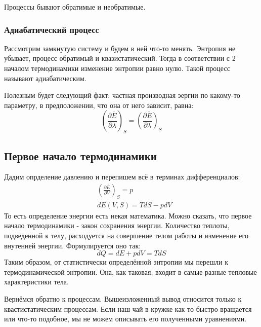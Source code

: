 \documentclass[a4paper, 12pt]{article}
\begin{document}
	Процессы бывают обратимые и необратимые.
	\subsubsection{Адиабатический процесс}
	Рассмотрим замкнутую систему и будем в ней что-то менять. Энтропия не убывает, процесс обратимый и квазистатический. Тогда в соответствии с 2 началом термодинамики изменение энтропии равно нулю. Такой процесс называют адиабатическим.
	
	
	Полезным будет следующий факт: частная производная эергии по какому-то параметру, в предположении, что она от него зависит, равна: 
	\begin{equation*}
		(\frac{\partial \overline{E}}{\partial \lambda} )_{S}= \overline{(\frac{\partial E}{\partial \lambda})_{S}}
	\end{equation*}
	\subsection{Первое начало термодинамики}
	Дадим опрделение давлению и перепишем всё в терминах дифференциалов:
	\begin{equation*}
		\begin{aligned}
			& (\frac{\partial \overline{E}}{\partial V} )_{S}= p \\
			& dE (V, S) = TdS -pdV                               
		\end{aligned}
	\end{equation*}
	То есть определение энергии есть некая математика. Можно сказать, что первое начало термодинамики - закон сохранения энергии. Количество теплоты, подведенной к телу, расходуется на совершение телом работы и изменение его внутенней энергии. 
	Формулируется оно так:
	\begin{equation*}
		dQ=dE+pdV=TdS
	\end{equation*}
	Таким образом, от статистически определённой энтропии мы перешли к термодинамической энтропии. Она, как таковая, входит в самые разные тепловые характеристики тела.
	
	Вернёмся обратно к процессам. Вышеизложенный вывод относится только к квастистатическим процессам. Если наш чай в кружке как-то быстро вращается или что-то подобное, мы не можем описывать его полученными уравнениями. 
\end{document}
